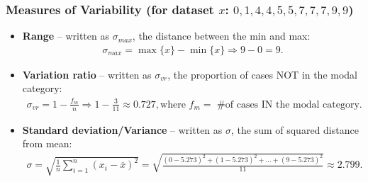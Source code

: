\documentclass[aspectratio=169]{beamer}
\theoremstyle{principle}
\begin{document}
\begin{frame}
\frametitle{Measures of Variability (for dataset $x$: $0, 1, 4, 4, 5, 5, 7, 7, 7, 9, 9$)}
\begin{itemize}

\item[]\color{white} \textbf{Range} -- written as $\sigma_{max}$, the distance between the min and max: 
\begin{align*}
\sigma_{max} = \max\{x\} - \min\{x\} \Longrightarrow 9 - 0 = 9.
\end{align*}

\item\color{black} \textbf{Variation ratio} -- written as $\sigma_{vr}$, the proportion of cases NOT in the modal category:
\begin{align*}
\sigma_{vr} = 1 - \frac{f_m}{n}\Longrightarrow 1 - \frac{3}{11} \approx 0.727, \mbox{where  }f_m =\mbox{ \# of cases IN the modal category}.
\end{align*}

\item[]\color{white} \textbf{Standard deviation/Variance} -- written as $\sigma$, the sum of squared distance from mean:
\begin{align*}
\sigma = \sqrt{\frac{1}{n}\sum_{i=1}^n(x_i - \overline{x})^2} = \sqrt{\frac{(0 - 5.273)^2 + (1 - 5.273)^2 + \hdots + (9 - 5.273)^2}{11}}\approx 2.799.
\end{align*}

\end{itemize}
\end{frame}
\end{document}
